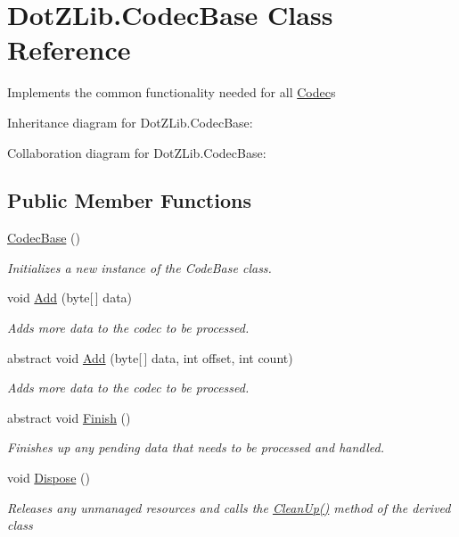 \hypertarget{class_dot_z_lib_1_1_codec_base}{\section{Dot\+Z\+Lib.\+Codec\+Base Class Reference}
\label{class_dot_z_lib_1_1_codec_base}
}


Implements the common functionality needed for all \hyperlink{interface_dot_z_lib_1_1_codec}{Codec}s  




Inheritance diagram for Dot\+Z\+Lib.\+Codec\+Base\+:


Collaboration diagram for Dot\+Z\+Lib.\+Codec\+Base\+:
\subsection*{Public Member Functions}
\begin{DoxyCompactItemize}
\item 
\hyperlink{class_dot_z_lib_1_1_codec_base_a1e372f5061c8f7c16a55bc41c55ebfa5}{Codec\+Base} ()
\begin{DoxyCompactList}\small\item\em Initializes a new instance of the {\ttfamily Code\+Base} class. \end{DoxyCompactList}\item 
void \hyperlink{class_dot_z_lib_1_1_codec_base_a9131ff23312ada67dbf58f428d562de4}{Add} (byte\mbox{[}$\,$\mbox{]} data)
\begin{DoxyCompactList}\small\item\em Adds more data to the codec to be processed. \end{DoxyCompactList}\item 
abstract void \hyperlink{class_dot_z_lib_1_1_codec_base_ab01e6ad1d9c5b05745dd9e487aaa40ee}{Add} (byte\mbox{[}$\,$\mbox{]} data, int offset, int count)
\begin{DoxyCompactList}\small\item\em Adds more data to the codec to be processed. \end{DoxyCompactList}\item 
abstract void \hyperlink{class_dot_z_lib_1_1_codec_base_abab96cb01a9b983452a31777e3a1e633}{Finish} ()
\begin{DoxyCompactList}\small\item\em Finishes up any pending data that needs to be processed and handled. \end{DoxyCompactList}\item 
void \hyperlink{class_dot_z_lib_1_1_codec_base_ab4bdcee97631d9e80d2bceb01d01f368}{Dispose} ()
\begin{DoxyCompactList}\small\item\em Releases any unmanaged resources and calls the \hyperlink{class_dot_z_lib_1_1_codec_base_aa0ded075105c5cf6f5f0d61928c90ca6}{Clean\+Up()} method of the derived class \end{DoxyCompactList}\end{DoxyCompactItemize}
